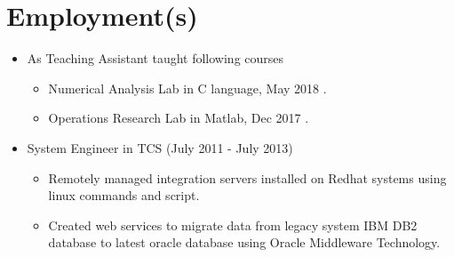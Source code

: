 \documentclass[a4paper,10pt]{article}
\begin{document}
	\section{Employment(s)}
	\begin{itemize}
			\item As Teaching Assistant taught following courses
                \begin{itemize}
                    \item Numerical Analysis Lab in C language, May 2018 .
                    \item Operations Research Lab in Matlab, Dec 2017 .
                \end{itemize}
            \item System Engineer in TCS (July 2011 - July 2013)
		        \begin{itemize}
			    	\item Remotely managed integration servers installed on Redhat systems using linux commands and script.
					\item Created web services to migrate data from legacy system IBM DB2 database to latest oracle database using Oracle Middleware Technology.
			\end{itemize}
	\end{itemize}
    
    
\end{document}

